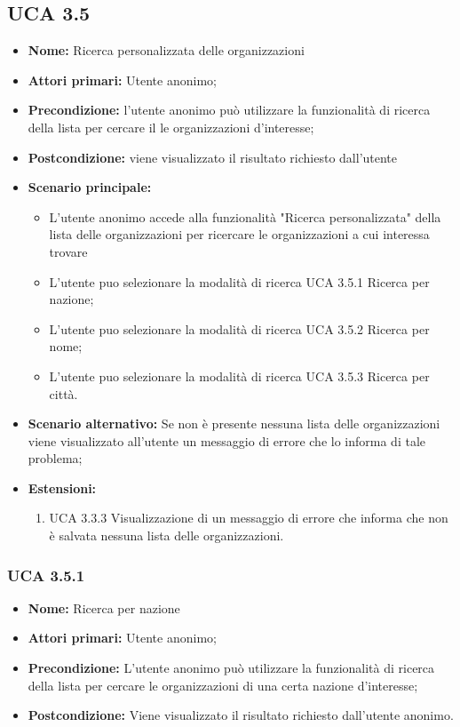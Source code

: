 \subsection{UCA 3.5}%
\begin{itemize}
	\item \textbf{Nome:} Ricerca personalizzata delle organizzazioni 
	\item \textbf{Attori primari:} Utente anonimo;
	\item \textbf{Precondizione:} l’utente anonimo può utilizzare la funzionalità di ricerca della lista per cercare il le organizzazioni d’interesse;
	\item \textbf{Postcondizione:} viene visualizzato il risultato richiesto dall’utente
	\item \textbf{Scenario principale:}
	\begin{itemize}
		\item L’utente anonimo accede alla funzionalità "Ricerca personalizzata" della lista delle organizzazioni per ricercare le organizzazioni a cui interessa trovare
		\item L'utente puo selezionare la modalità di ricerca UCA 3.5.1 Ricerca per nazione;
		\item L'utente puo selezionare la modalità di ricerca UCA 3.5.2 Ricerca per nome;
		\item L'utente puo selezionare la modalità di ricerca UCA 3.5.3 Ricerca per città.
	\end{itemize}
	\item \textbf{Scenario alternativo:} Se non è presente nessuna lista delle organizzazioni viene visualizzato all’utente un messaggio di errore che lo informa di tale problema;
	\item \textbf{Estensioni:}
	\begin{enumerate}
		\item UCA 3.3.3 Visualizzazione di un messaggio di errore che informa che non è salvata nessuna lista delle organizzazioni.
	\end{enumerate}
\end{itemize}

\subsubsection{UCA 3.5.1}%
\begin{itemize}
	\item \textbf{Nome:} Ricerca per nazione
	\item \textbf{Attori primari:} Utente anonimo;
	\item \textbf{Precondizione:} L’utente anonimo può utilizzare la funzionalità di ricerca della lista per cercare le organizzazioni di una certa nazione d’interesse;
	\item \textbf{Postcondizione:} Viene visualizzato il risultato richiesto dall’utente anonimo.
\end{itemize}


